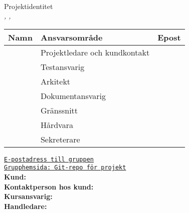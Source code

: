 \documentclass[kravspec/krav.tex]{subfiles}
\newenvironment{projektidentitet}{%
{\ }\vspace{30mm}
\renewcommand{\arraystretch}{2}
\begin{center}
  {\huge Projektidentitet\\[1ex]}
  \textsl{\VARgruppnummer, \LIPSdatum, \VARprojekttitel}\\[1cm]
    \begin{tabular}{lp{60mm}l}
      \hline
      \textbf{Namn} &
      \textbf{Ansvarsområde} &
      \textbf{Epost} \\
	\hline
      }%
      {%
      \hline
    \end{tabular}
\end{center}
}
\newcommand{\gruppmedlem}[3]{{#1} & {#2} & {#3} \\}
\begin{document}
\thispagestyle{empty}

\begin{projektidentitet}
\gruppmedlem{\VARprojektledare}{Projektledare och kundkontakt}
    {\href{mailto:\VARprojektledaremail}
    {\texttt{\VARprojektledaremail}}}
\gruppmedlem{\VARkundansvarig}{Testansvarig}
    {\href{mailto:\VARkundansvarigmail}
    {\texttt{\VARkundansvarigmail}}}
\gruppmedlem{\VARarkitekt}{Arkitekt}
    {\href{mailto:\VARarkitektmail}
    {\texttt{\VARarkitektmail}}}
\gruppmedlem{\VARdokumentansvarig}{Dokumentansvarig}
    {\href{mailto:\VARdokumentansvarigmail}
    {\texttt{\VARdokumentansvarigmail}}}
\gruppmedlem{\VARgranssnitt}{Gränssnitt}
    {\href{mailto:\VARgranssnittmail}
    {\texttt{\VARgranssnittmail}}}
\gruppmedlem{\VARhardware}{Hårdvara}
    {\href{mailto:\VARhardwaremail}
    {\texttt{\VARhardwaremail}}}
\gruppmedlem{\VARsekreterare}{Sekreterare}
    {\href{mailto:\VARsekreteraremail}
    {\texttt{\VARsekreteraremail}}}
\end{projektidentitet}

\begin{center}
\vspace{0.5cm}
{\href{mailto:\VARdokumentansvarigmail,\VARarkitektmail,\VARprojektledaremail,
    \VARgranssnittmail,\VARprojektledaremail,\VARhardwaremail,
    \VARsekreteraremail,\VARkundansvarigmail}{
\texttt{E-postadress till gruppen}}}\\

{\href{\VARgrupphemsida}{
\texttt{Grupphemsida: Git-repo för projekt}}}\\[1cm]

{\textbf{Kund:} \VARbestallare}\\[0.5ex]
{\textbf{Kontaktperson hos kund:} \VARkontaktperson}\\[1cm]

{\textbf{Kursansvarig:} \VARkursansvarig}\\[1ex]
{\textbf{Handledare:} \VARhandledare}

\end{center}
\newpage
\end{document}

